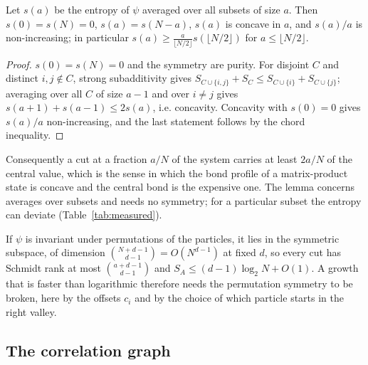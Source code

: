 \begin{lem}\label{lem:chord}
Let $s(a)$ be the entropy of $\psi$ averaged over all subsets of size $a$. Then $s(0)=s(N)=0$, $s(a)=s(N-a)$, $s(a)$ is concave in $a$, and $s(a)/a$ is non-increasing; in particular $s(a)\ge\frac{a}{\lfloor N/2\rfloor}s(\lfloor N/2\rfloor)$ for $a\le\lfloor N/2\rfloor$.
\end{lem}
\begin{proof}
$s(0)=s(N)=0$ and the symmetry are purity. For disjoint $C$ and distinct $i,j\notin C$, strong subadditivity gives $S_{C\cup\{i,j\}}+S_C\le S_{C\cup\{i\}}+S_{C\cup\{j\}}$; averaging over all $C$ of size $a-1$ and over $i\ne j$ gives $s(a+1)+s(a-1)\le2s(a)$, i.e. concavity. Concavity with $s(0)=0$ gives $s(a)/a$ non-increasing, and the last statement
follows by the chord inequality.
\end{proof}
Consequently a cut at a fraction $a/N$ of the system carries at least $2a/N$ of the central value, which is the sense in which the bond profile of a matrix-product state is concave and the central bond is the expensive one. The lemma concerns averages over subsets and needs no symmetry; for a particular subset the entropy can deviate (Table~\ref{tab:measured}).

\begin{rem}\label{rem:symm}
If $\psi$ is invariant under permutations of the particles, it lies in the symmetric subspace, of dimension $\binom{N+d-1}{d-1}=O(N^{d-1})$ at fixed $d$, so every cut has Schmidt rank at most $\binom{a+d-1}{d-1}$ and $S_A\le(d-1)\log_2N+O(1)$. A growth that is faster than logarithmic therefore needs the permutation symmetry to be broken,
here by the offsets $c_i$ and by the choice of which particle starts in the right valley.
\end{rem}

\subsection{The correlation graph}

